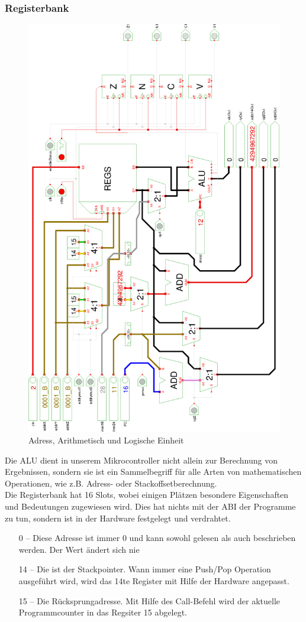 \subsubsection{Registerbank}
\begin{figure}[!h]
\centering
\includegraphics[width=.8\textwidth]{images/alu.eps}
\caption{\label{HW:ALU}Adress, Arithmetisch und Logische Einheit}
\end{figure}
Die ALU dient in unserem Mikrocontroller nicht allein zur Berechnung von Ergebnissen, sondern sie ist ein Sammelbegriff für alle Arten von mathematischen Operationen, wie z.B. Adress- oder Stackoffsetberechnung.\\
Die Registerbank hat 16 Slots, wobei einigen Plätzen besondere Eigenschaften und Bedeutungen zugewiesen wird. Dies hat nichts mit der ABI der Programme zu tun, sondern ist in der Hardware festgelegt und verdrahtet.
\begin{itemize}
  \item[0 --] Diese Adresse ist immer 0 und kann sowohl gelesen als auch beschrieben werden. Der Wert ändert sich nie
  \item[14 --] Die ist der Stackpointer. Wann immer eine Push/Pop Operation ausgeführt wird, wird das 14te Register mit Hilfe der Hardware angepasst.
  \item[15 --] Die Rücksprungadresse. Mit Hilfe des Call-Befehl wird der aktuelle Programmcounter in das Regsiter 15 abgelegt.
\end{itemize}

